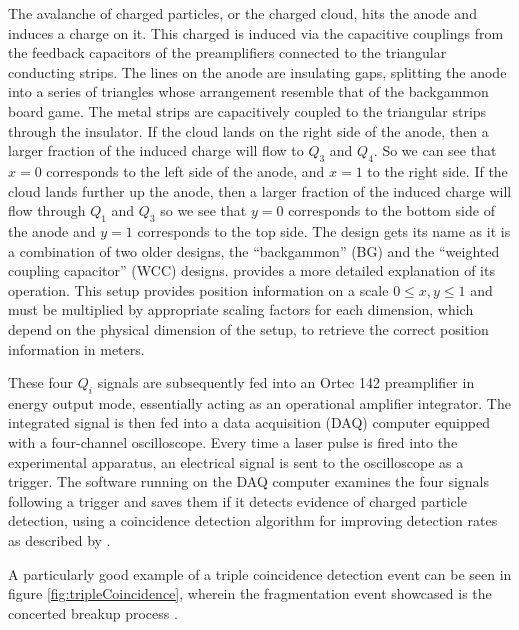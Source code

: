 The avalanche of charged particles, or the charged cloud, hits the anode and induces a charge on it. This charged is induced via the capacitive couplings from the feedback capacitors of the preamplifiers connected to the triangular conducting strips. The lines on the anode are insulating gaps, splitting the anode into a series of triangles whose arrangement resemble that of the backgammon board game. The metal strips are capacitively coupled to the triangular strips through the insulator. If the cloud lands on the right side of the anode, then a larger fraction of the induced charge will flow to $Q_3$ and $Q_4$. So we can see that $x=0$ corresponds to the left side of the anode, and $x=1$ to the right side. If the cloud lands further up the anode, then a larger fraction of the induced charge will flow through $Q_1$ and $Q_3$ so we see that $y=0$ corresponds to the bottom side of the anode and $y=1$ corresponds to the top side. The design gets its name as it is a combination of two older designs, the ``backgammon'' (BG) and the ``weighted coupling capacitor'' (WCC) designs. \citet{Mizogawa92} provides a more detailed explanation of its operation. This setup provides position information on a scale $0 \le x,y \le 1$ and must be multiplied by appropriate scaling factors for each dimension, which depend on the physical dimension of the setup, to retrieve the correct position information in meters.

These four $Q_i$ signals are subsequently fed into an Ortec 142 preamplifier in energy output mode, essentially acting as an operational amplifier integrator. The integrated signal is then fed into a data acquisition (DAQ) computer equipped with a four-channel oscilloscope. Every time a laser pulse is fired into the experimental apparatus, an electrical signal is sent to the oscilloscope as a trigger. The software running on the DAQ computer examines the four signals following a trigger and saves them if it detects evidence of charged particle detection, using a coincidence detection algorithm for improving detection rates as described by \citet{Wales12Algorithm}.

A particularly good example of a triple coincidence detection event can be seen in figure \ref{fig:tripleCoincidence}, wherein the fragmentation event showcased is the concerted breakup process .

